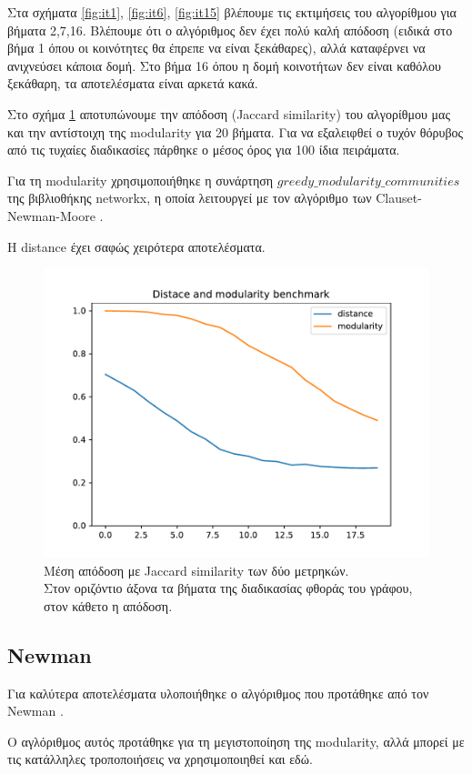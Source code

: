 \documentclass[12pt, letterpaper]{article}
\newcommand{\en}{\selectlanguage{english}}
\newcommand{\gr}{\selectlanguage{greek}}
\begin{document}
Στα σχήματα \ref{fig:it1}, \ref{fig:it6}, \ref{fig:it15} βλέπουμε τις εκτιμήσεις του 
αλγορίθμου για βήματα 2,7,16. Βλέπουμε ότι ο αλγόριθμος δεν έχει πολύ καλή απόδοση 
(ειδικά στο βήμα 1 όπου οι κοινότητες θα έπρεπε να είναι ξεκάθαρες), αλλά καταφέρνει 
να ανιχνεύσει κάποια δομή. Στο βήμα 16 όπου η δομή κοινοτήτων δεν είναι καθόλου ξεκάθαρη, 
τα αποτελέσματα είναι αρκετά κακά.

Στο σχήμα \ref{bench1} αποτυπώνουμε την απόδοση (\textlatin{Jaccard similarity})
του αλγορίθμου μας και την αντίστοιχη της \textlatin{modularity} για 20 βήματα.  
Για να εξαλειφθεί ο τυχόν θόρυβος από τις τυχαίες διαδικασίες πάρθηκε ο μέσος όρος 
για 100 ίδια πειράματα. 

Για τη \textlatin{modularity} χρησιμοποιήθηκε η συνάρτηση $greedy\_modularity\_communities$ της 
βιβλιοθήκης \textlatin{networkx}, η οποία λειτουργεί με τον αλγόριθμο των \en Clauset-Newman-Moore \gr 
\cite{Clauset:fastgreedy}\relax.
 
Η \textlatin{distance} έχει σαφώς χειρότερα αποτελέσματα.


\begin{figure}
  \centering
  \includegraphics[width=0.5\linewidth]{benchmark.pdf}
  \caption{Μέση απόδοση με \textlatin{Jaccard similarity} των δύο μετρηκών. \\
  Στον οριζόντιο άξονα τα βήματα της διαδικασίας φθοράς του γράφου, στον κάθετο η απόδοση.}
  \label{bench1}
\end{figure}


\subsection{\textlatin{Newman}}

Για καλύτερα αποτελέσματα υλοποιήθηκε ο αλγόριθμος που προτάθηκε από τον \textlatin{Newman} 
\cite{Newman}\relax. 

Ο αγλόριθμος αυτός προτάθηκε για τη μεγιστοποίηση της \en modularity, \gr αλλά μπορεί με τις κατάλληλες τροποποιήσεις να χρησιμοποιηθεί και εδώ.
\end{document}
